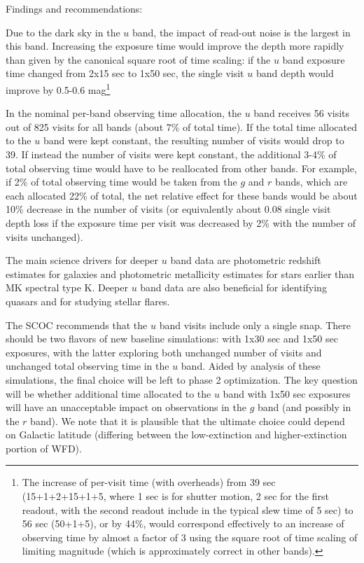 Findings and recommendations:

Due to the dark sky in the $u$ band, the impact of read-out noise is the largest in this band. Increasing the exposure time would improve the depth more rapidly than given by the canonical  square root of time scaling: if the $u$ band exposure time changed from 2x15 sec to 1x50 sec, the single visit $u$ band depth would improve by 0.5-0.6 mag\footnote{The increase of per-visit time (with overheads) from 39 sec (15+1+2+15+1+5, where 1 sec is for shutter motion, 2 sec for the first readout, with the second readout include in the typical slew time of 5 sec) to 56 sec (50+1+5), or by 44\%, would correspond effectively to an increase of observing time by almost a factor of 3 using the square root of time scaling of limiting magnitude (which is approximately correct in other bands). }

In the nominal per-band observing time allocation, the $u$ band receives 56 visits out of 825 visits for all bands (about 7\% of total time). If the total time allocated to the $u$ band were kept constant, the resulting number of visits would drop to 39. If instead the number of visits were kept constant, the additional 3-4\% of total observing time would have to be reallocated from other bands. For example, if 2\% of total observing time would be taken from the $g$ and $r$ bands, which are each allocated 22\% of total, the net relative effect for these bands would be about 10\% decrease in the number of visits (or equivalently about 0.08 single visit depth loss if the exposure time per visit was decreased by 2\% with the number of visits unchanged). 

The main science drivers for deeper $u$ band data are photometric redshift estimates for galaxies and photometric metallicity estimates for stars earlier than MK spectral type K.  Deeper $u$ band data are also beneficial for identifying quasars and for studying stellar flares.

The SCOC recommends that the $u$ band visits include only a single snap. There should be two flavors of new baseline simulations: with 1x30 sec and 1x50 sec exposures, with the latter exploring both unchanged number of visits and unchanged total observing time in the $u$ band. Aided by analysis of these simulations, the final choice will be left to phase 2 optimization. The key question will be whether additional time allocated to the $u$ band with 1x50 sec exposures will have an unacceptable impact on observations in the $g$ band (and possibly in the $r$ band). We note that it is plausible that the ultimate choice could depend on Galactic latitude (differing between the low-extinction and higher-extinction portion of WFD).


